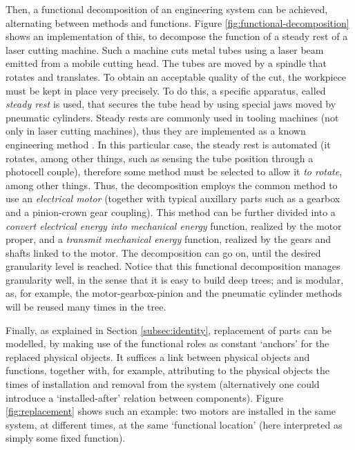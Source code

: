 \documentclass[
]{ceurart}
\begin{document}
Then, a functional decomposition of an engineering system can be achieved, alternating between methods and functions. Figure \ref{fig:functional-decomposition} shows an implementation of this, to decompose the function of a steady rest of a laser cutting machine.
Such a machine cuts metal tubes using a laser beam emitted from a mobile cutting head. The tubes are moved by a spindle that rotates and translates. To obtain an acceptable quality of the cut, the workpiece must be kept in place very precisely. To do this, a specific apparatus, called \textit{steady rest} is used, that secures the tube head by using special jaws moved by pneumatic cylinders. %
Steady rests are commonly used in tooling machines (not only in laser cutting machines), thus they are implemented as a known engineering method%
. In this particular case, the steady rest is automated (it rotates, among other things, such as sensing the tube position through a photocell couple), therefore some method must be selected to allow it \textit{to rotate}, among other things. Thus, the decomposition employs the common method to use an \textit{electrical motor} (together with typical auxillary parts such as a gearbox and a pinion-crown gear coupling). This method can be further divided into a \textit{convert electrical energy into mechanical energy} function, realized by the motor proper, and a \textit{transmit mechanical energy} function, realized by the gears and shafts linked to the motor. The decomposition can go on, until the desired granularity level is reached. 
Notice that this functional decomposition manages granularity well, in the sense that it is easy to build deep trees; and is modular, as, for example, the motor-gearbox-pinion and the pneumatic cylinder methods will be reused many times in the tree.

Finally, as explained in Section \ref{subsec:identity}, replacement of parts can be modelled, by making use of the functional roles as constant `anchors' for the replaced physical objects. It suffices a link between physical objects and functions, together with, for example, attributing to the physical objects the times of installation and removal from the system (alternatively one could introduce a `installed-after' relation between components). Figure \ref{fig:replacement} shows such an example: two motors are installed in the same system, at different times, at the same `functional location' (here interpreted as simply some fixed function).
\end{document}
